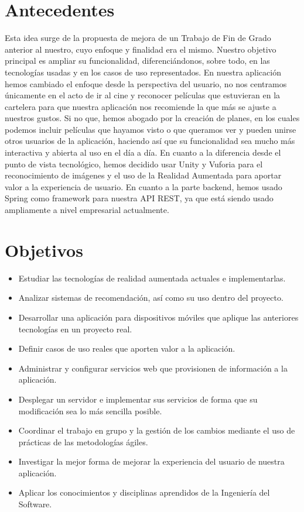 \section{Antecedentes}
\label{makereference1.1}
\begin{flushleft}
    Esta idea surge de la propuesta de mejora de un Trabajo de Fin de Grado anterior
    al nuestro, cuyo enfoque y finalidad era el mismo. Nuestro objetivo principal es 
    ampliar su funcionalidad, diferenciándonos, sobre todo, en las tecnologías usadas y 
    en los casos de uso representados.
    En nuestra aplicación hemos cambiado el enfoque desde la perspectiva del usuario, no 
    nos centramos únicamente en el acto de ir al cine y reconocer películas que estuvieran en la cartelera
    para que nuestra aplicación nos recomiende la que más se ajuste a nuestros gustos. Si no que, hemos 
    abogado por la creación de planes, en los cuales podemos incluir películas que hayamos visto o que queramos ver
    y pueden unirse otros usuarios de la aplicación, haciendo así que su funcionalidad sea mucho más interactiva y 
    abierta al uso en el día a día.
    En cuanto a la diferencia desde el punto de vista tecnológico, hemos decidido usar Unity y Vuforia para el reconocimiento
    de imágenes y el uso de la Realidad Aumentada para aportar valor a la experiencia de usuario. En cuanto a la parte backend, 
    hemos usado Spring como framework para nuestra API REST, ya que está siendo usado ampliamente a nivel empresarial actualmente.
\end{flushleft}
\newpage
\section{Objetivos}
\label{makereference1.2}
\begin{itemize}  
    \item Estudiar las tecnologías de realidad aumentada actuales e implementarlas.
    \item Analizar sistemas de recomendación, así como su uso dentro del proyecto.
    \item Desarrollar una aplicación para dispositivos móviles que aplique las anteriores tecnologías en un proyecto real.
    \item Definir casos de uso reales que aporten valor a la aplicación.
    \item Administrar y configurar servicios web que provisionen de información a la aplicación.
    \item Desplegar un servidor e implementar sus servicios de forma que su modificación sea lo más sencilla posible.
    \item Coordinar el trabajo en grupo y la gestión de los cambios mediante el uso de prácticas de las metodologías ágiles.
    \item Investigar la mejor forma de mejorar la experiencia del usuario de nuestra aplicación.
    \item Aplicar los conocimientos y disciplinas aprendidos de la Ingeniería del Software.
\end{itemize}

